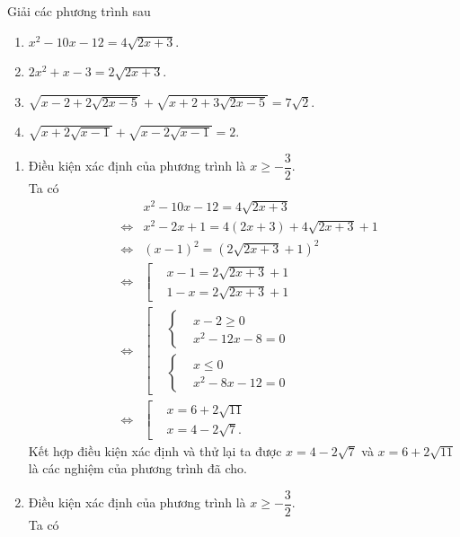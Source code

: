 \begin{bt}
	Giải các phương trình sau
	\begin{enumerate}
		\item $x^2-10x-12=4\sqrt{2x+3}$.
		\item $2x^2+x-3=2\sqrt{2x+3}$.
		\item $\sqrt{x-2+2\sqrt{2x-5}} + \sqrt{x+2+3\sqrt{2x-5}} = 7\sqrt{2}$.
		\item $\sqrt{x+2\sqrt{x-1}} + \sqrt{x-2\sqrt{x-1}} = 2$.
	\end{enumerate}
	\loigiai
	{
		\begin{enumerate}
			\item Điều kiện xác định của phương trình là $x\geq -\dfrac{3}{2}$.\\
			Ta có
			\allowdisplaybreaks
			\begin{eqnarray*}
				&& x^2-10x-12=4\sqrt{2x+3}\\
				&\Leftrightarrow & x^2-2x+1=4(2x+3)+4\sqrt{2x+3}+1\\
				&\Leftrightarrow & (x-1)^2=\left(2\sqrt{2x+3}+1\right)^2\\
				&\Leftrightarrow & \left[\begin{aligned}&x-1=2\sqrt{2x+3}+1 \\&1-x=2\sqrt{2x+3}+1\end{aligned}\right.\\
				&\Leftrightarrow & \left[\begin{aligned}&\left\{\begin{aligned}&x-2\geq 0 \\&x^2-12x-8=0\end{aligned}\right. \\&\left\{\begin{aligned}&x\leq 0 \\&x^2-8x-12=0\end{aligned}\right.\end{aligned}\right.\\
				&\Leftrightarrow & \left[\begin{aligned}&x=6+2\sqrt{11} \\&x=4-2\sqrt{7}.\end{aligned}\right.
			\end{eqnarray*}
			Kết hợp điều kiện xác định và thử lại ta được $x=4-2\sqrt{7}$ và $x=6+2\sqrt{11}$ là các nghiệm của phương trình đã cho.
			\item Điều kiện xác định của phương trình là $x\geq -\dfrac{3}{2}$.\\
			Ta có
			\allowdisplaybreaks

\end{enumerate}}
\end{bt}
